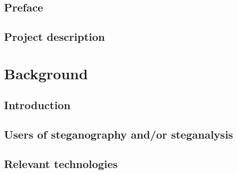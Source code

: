 
\raggedbottom



\frontmatter
 

\cleardoublepage

\cleardoublepage

\chapter*{Preface}


\cleardoublepage

{}
\tableofcontents*

\mainmatter
  

\chapter{Project description}


\part{Background}
\chapter{Introduction}


\chapter{Users of steganography and/or steganalysis}


\chapter{Relevant technologies}


\begingroup
 \raggedright
 
\endgroup

\appendix
\clearforchapter


